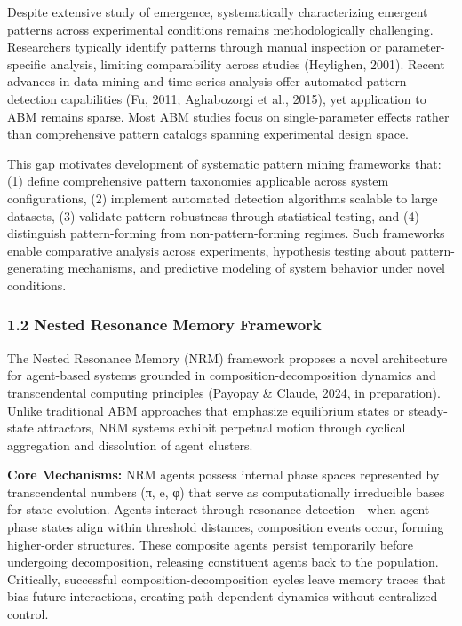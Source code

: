 \documentclass[
]{article}
\begin{document}
Despite extensive study of emergence, systematically characterizing
emergent patterns across experimental conditions remains
methodologically challenging. Researchers typically identify patterns
through manual inspection or parameter-specific analysis, limiting
comparability across studies (Heylighen, 2001). Recent advances in data
mining and time-series analysis offer automated pattern detection
capabilities (Fu, 2011; Aghabozorgi et al., 2015), yet application to
ABM remains sparse. Most ABM studies focus on single-parameter effects
rather than comprehensive pattern catalogs spanning experimental design
space.

This gap motivates development of systematic pattern mining frameworks
that: (1) define comprehensive pattern taxonomies applicable across
system configurations, (2) implement automated detection algorithms
scalable to large datasets, (3) validate pattern robustness through
statistical testing, and (4) distinguish pattern-forming from
non-pattern-forming regimes. Such frameworks enable comparative analysis
across experiments, hypothesis testing about pattern-generating
mechanisms, and predictive modeling of system behavior under novel
conditions.

\subsubsection{1.2 Nested Resonance Memory
Framework}\label{nested-resonance-memory-framework}

The Nested Resonance Memory (NRM) framework proposes a novel
architecture for agent-based systems grounded in
composition-decomposition dynamics and transcendental computing
principles (Payopay \& Claude, 2024, in preparation). Unlike traditional
ABM approaches that emphasize equilibrium states or steady-state
attractors, NRM systems exhibit perpetual motion through cyclical
aggregation and dissolution of agent clusters.

\textbf{Core Mechanisms:} NRM agents possess internal phase spaces
represented by transcendental numbers (π, e, φ) that serve as
computationally irreducible bases for state evolution. Agents interact
through resonance detection---when agent phase states align within
threshold distances, composition events occur, forming higher-order
structures. These composite agents persist temporarily before undergoing
decomposition, releasing constituent agents back to the population.
Critically, successful composition-decomposition cycles leave memory
traces that bias future interactions, creating path-dependent dynamics
without centralized control.
\end{document}
